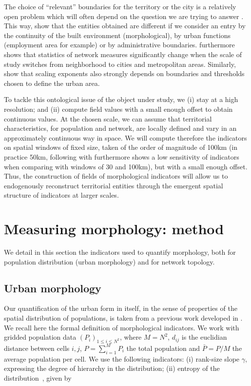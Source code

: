 \documentclass[11pt]{article}
\begin{document}
The choice of ``relevant'' boundaries for the territory or the city is a relatively open problem which will often depend on the question we are trying to answer \citep{paez2005spatial}. This way, \cite{guerois2002commune} show that the entities obtained are different if we consider an entry by the continuity of the built environment (morphological), by urban functions (employment area for example) or by administrative boundaries. \cite{boeing2017multi} furthermore shows that statistics of network measures significantly change when the scale of study switches from neighborhood to cities and metropolitan areas. Similarly, \cite{cottineau2017diverse} show that scaling exponents also strongly depends on boundaries and thresholds chosen to define the urban area.

To tackle this ontological issue of the object under study, we (i) stay at a high resolution; and (ii) compute field values with a small enough offset to obtain continuous values. At the chosen scale, we can assume that territorial characteristics, for population and network, are locally defined and vary in an approximately continuous way in space. We will compute therefore the indicators on spatial windows of fixed size, taken of the order of magnitude of 100km (in practice 50km, following \cite{2017arXiv170806743R} with furthermore shows a low sensitivity of indicators when comparing with windows of 30 and 100km), but with a small enough offset. Thus, the construction of fields of morphological indicators will allow us to endogenously reconstruct territorial entities through the emergent spatial structure of indicators at larger scales.



\section{Measuring morphology: method}


We detail in this section the indicators used to quantify morphology, both for population distribution (urban morphology) and for network topology.


\subsection{Urban morphology}


Our quantification of the urban form in itself, in the sense of properties of the spatial distribution of populations, is taken from a previous work developed in \cite{2017arXiv170806743R}. We recall here the formal definition of morphological indicators. We work with gridded population data $(P_i)_{1\leq i \leq N^2}$, where $M=N^2$, $d_{ij}$ is the euclidian distance between cells $i,j$, $P=\sum_{i=1}^{M} P_i$ the total population and $\bar{P} = P / M$ the average population per cell. We use the following indicators: (i) rank-size slope $\gamma$, expressing the degree of hierarchy in the distribution; (ii) entropy of the distribution~\citep{le2015forme}, given by 
\end{document}
